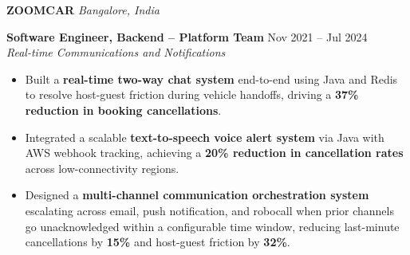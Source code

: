 \documentclass[11pt,a4paper]{article}
\begin{document}
\vspace{4pt}

{\Large\bfseries ZOOMCAR} \hfill \textit{Bangalore, India}

\vspace{3pt}
\noindent\textbf{Software Engineer, Backend -- Platform Team} \hfill Nov 2021 -- Jul 2024 \\
\textit{Real-time Communications and Notifications}\vspace{3pt}
\begin{itemize}[leftmargin=*, noitemsep, topsep=1pt, label={\small\textbullet}, itemsep=0pt]
\RaggedRight
    \item Built a \textbf{real-time two-way chat system} end-to-end using Java and Redis to resolve host-guest friction during vehicle handoffs, driving a \textbf{37\% reduction in booking cancellations}.
    \item Integrated a scalable \textbf{text-to-speech voice alert system} via Java with AWS webhook tracking, achieving a \textbf{20\% reduction in cancellation rates} across low-connectivity regions.
    \item Designed a \textbf{multi-channel communication orchestration system} escalating across email, push notification, and robocall when prior channels go unacknowledged within a configurable time window, reducing last-minute cancellations by \textbf{15\%} and host-guest friction by \textbf{32\%}.
\end{itemize}
\end{document}
